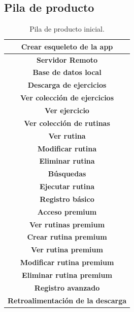 \documentclass[11pt,a4paper]{report}
\begin{document}
\subsection{Pila de producto}
\begin{table}[H]
	\centering
	\label{tab1}
	\begin{tabular}{|c|}
		\hline
		\rowcolor[HTML]{BBDAFF}
		\textbf{Crear esqueleto de la app}  \\ \hline
		\rowcolor[HTML]{BBDAFF}
		\textbf{Servidor Remoto}  \\ \hline
		\rowcolor[HTML]{BBDAFF}
		\textbf{Base de datos local}  \\ \hline
		\rowcolor[HTML]{BBDAFF}
		\textbf{Descarga de ejercicios}  \\ \hline
		\rowcolor[HTML]{BBDAFF}
		\textbf{Ver colección de ejercicios}  \\ \hline
		\rowcolor[HTML]{BBDAFF}
		\textbf{Ver ejercicio}  \\ \hline
		\rowcolor[HTML]{BBDAFF}
		\textbf{Ver colección de rutinas}  \\ \hline
		\rowcolor[HTML]{BBDAFF}
		\textbf{Ver rutina}  \\ \hline
		\rowcolor[HTML]{BBDAFF}
		\textbf{Modificar rutina}  \\ \hline
		\rowcolor[HTML]{BBDAFF}
		\textbf{Eliminar rutina}  \\ \hline
		\rowcolor[HTML]{9AFF99}
		\textbf{Búsquedas}  \\ \hline
		\rowcolor[HTML]{9AFF99}
		\textbf{Ejecutar rutina}  \\ \hline
		\rowcolor[HTML]{9AFF99}
		\textbf{Registro básico}  \\ \hline
		\rowcolor[HTML]{9AFF99}
		\textbf{Acceso premium}  \\ \hline
		\rowcolor[HTML]{9AFF99}
		\textbf{Ver rutinas premium}  \\ \hline
		\rowcolor[HTML]{9AFF99}
		\textbf{Crear rutina premium}  \\ \hline
		\rowcolor[HTML]{9AFF99}
		\textbf{Ver rutina premium}  \\ \hline
		\rowcolor[HTML]{9AFF99}
		\textbf{Modificar rutina premium}  \\ \hline
		\rowcolor[HTML]{9AFF99}
		\textbf{Eliminar rutina premium}  \\ \hline
		\rowcolor[HTML]{9AFF99}
		\textbf{Registro avanzado}  \\ \hline
		\rowcolor[HTML]{9AFF99}
		\textbf{Retroalimentación de la descarga}  \\ \hline
	\end{tabular}
	\caption{Pila de producto inicial.}         
\end{table}
\end{document}
